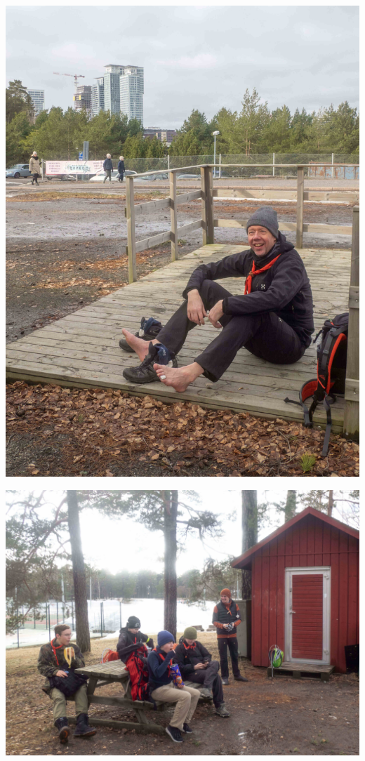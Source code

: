 \documentclass[10pt,finnish,a5paper,headings=small,twoside=semi]{scrartcl}
\begin{document}
\begin{multicols}{2}
	\vspace*{0.16cm}
	\noindent\includegraphics[width=\linewidth]{assets/nahkaliljamikko}

	\vspace*{0.16cm}
	\noindent\includegraphics[width=\linewidth]{assets/nahkaliljamustikkamaa}


\end{multicols}
\end{document}
